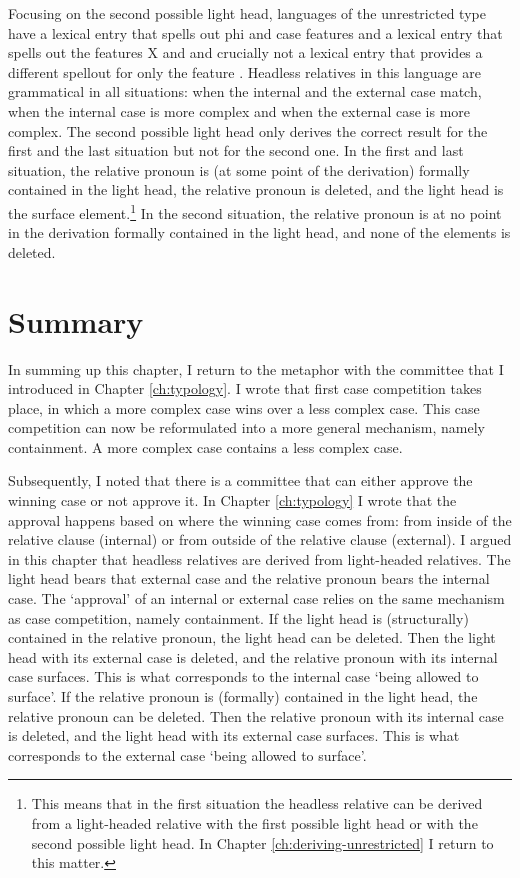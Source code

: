 Focusing on the second possible light head, languages of the unrestricted type have a lexical entry that spells out phi and case features and a lexical entry that spells out the features X and  and crucially not a lexical entry that provides a different spellout for only the feature .
Headless relatives in this language are grammatical in all situations: when the internal and the external case match, when the internal case is more complex and when the external case is more complex.
The second possible light head only derives the correct result for the first and the last situation but not for the second one.
In the first and last situation, the relative pronoun is (at some point of the derivation) formally contained in the light head, the relative pronoun is deleted, and the light head is the surface element.\footnote{
This means that in the first situation the headless relative can be derived from a light-headed relative with the first possible light head or with the second possible light head. In Chapter \ref{ch:deriving-unrestricted} I return to this matter.
}
In the second situation, the relative pronoun is at no point in the derivation formally contained in the light head, and none of the elements is deleted.


\section{Summary}

In summing up this chapter, I return to the metaphor with the committee that I introduced in Chapter \ref{ch:typology}. I wrote that first case competition takes place, in which a more complex case wins over a less complex case. This case competition can now be reformulated into a more general mechanism, namely containment. A more complex case contains a less complex case.

Subsequently, I noted that there is a committee that can either approve the winning case or not approve it. In Chapter \ref{ch:typology} I wrote that the approval happens based on where the winning case comes from: from inside of the relative clause (internal) or from outside of the relative clause (external). I argued in this chapter that headless relatives are derived from light-headed relatives. The light head bears that external case and the relative pronoun bears the internal case. The `approval' of an internal or external case relies on the same mechanism as case competition, namely containment.
If the light head is (structurally) contained in the relative pronoun, the light head can be deleted. Then the light head with its external case is deleted, and the relative pronoun with its internal case surfaces. This is what corresponds to the internal case `being allowed to surface'.
If the relative pronoun is (formally) contained in the light head, the relative pronoun can be deleted. Then the relative pronoun with its internal case is deleted, and the light head with its external case surfaces. This is what corresponds to the external case `being allowed to surface'.

